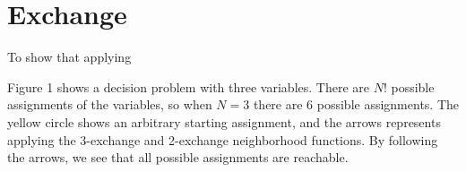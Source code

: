 \section{Exchange}




To show that applying 



Figure 1 shows a decision problem with three variables. There are $N!$ possible assignments of the variables, so when $N = 3$ there are $6$ possible assignments. The yellow circle shows an arbitrary starting assignment, and the arrows represents applying the 3-exchange and 2-exchange neighborhood functions. By following the arrows, we see that all possible assignments are reachable.